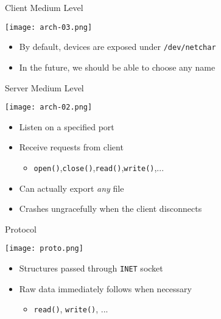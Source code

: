 \documentclass[handout]{beamer}
\begin{document}
\begin{frame}[c]{Client Medium Level}
  \begin{center}
    \texttt{[image: arch-03.png]}
  \end{center}

  \begin{itemize}
    \item<1-> By default, devices are exposed under \texttt{/dev/netchar}
    \item<2-> In the future, we should be able to choose any name
  \end{itemize}
\end{frame}

\begin{frame}[c]{Server Medium Level}
  \begin{center}
    \texttt{[image: arch-02.png]}
  \end{center}
  \begin{itemize}
    \item<1-> Listen on a specified port
    \item<2-> Receive requests from client
    \begin{itemize}
      \item<2-> \texttt{open()},\texttt{close()},\texttt{read()},\texttt{write()},...
    \end{itemize}
    \item<3-> Can actually export \textit{any} file
    \item<4-> Crashes ungracefully when the client disconnects
  \end{itemize}
\end{frame}

\begin{frame}[c]{Protocol}
  \begin{center}
    \texttt{[image: proto.png]}
  \end{center}

  \begin{itemize}
    \item<1-> Structures passed through \texttt{INET} socket
    \item<2-> Raw data immediately follows when necessary
    \begin{itemize}
      \item<2-> \texttt{read()}, \texttt{write()}, ...
    \end{itemize}
  \end{itemize}
\end{frame}
\end{document}
